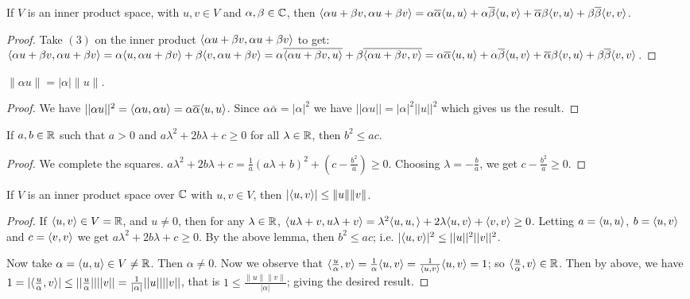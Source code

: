 \begin{lemma}
    If $V$ is an inner product space, with  $u,v \in V$ and  $\alpha,\beta \in \mathbb{C}$, then
    $\langle \alpha u+\beta v, \alpha u+\beta
    v\rangle=\alpha\overline{\alpha}\langle u,u\rangle+\alpha\overline{\beta}\langle u,v\rangle+\overline{\alpha}\beta\langle v,u\rangle+\beta\overline{\beta}\langle v,v\rangle$.
\end{lemma}
\begin{proof}
    Take $(3)$ on the inner product $\langle \alpha u+\beta v, \alpha u+\beta v\rangle$ to get: 
    $\langle \alpha u+\beta v, \alpha u+\beta v\rangle=\alpha\langle u,\alpha u+\beta v\rangle+\beta\langle v,
    \alpha u+\beta v\rangle=\alpha\overline{\langle \alpha u+\beta v,u\rangle}+\beta\overline{\langle \alpha u+\beta
v,v\rangle}=\alpha\overline{\alpha}\langle u,u\rangle+\alpha\overline{\beta}\langle u,v\rangle+\overline{\alpha}\beta\langle v,u\rangle+\beta\overline{\beta}\langle v,v\rangle$.
\end{proof}
\begin{corollary}
    $\|\alpha u\|=|\alpha|\|u\|.$
\end{corollary}
\begin{proof}
    We have $||\alpha u||^2=\langle \alpha u, \alpha u\rangle=\alpha\overline{\alpha}\langle u,u\rangle$. Since
    $\alpha\bar{\alpha}=|\alpha|^2$ we have $||\alpha u||=|\alpha|^2||u||^2$ which gives us the
    result.
\end{proof}

\begin{lemma}
    If $a,b \in \mathbb{R}$ such that $a>0$ and  $a\lambda^2+2b\lambda+c \geq 0$ for all  $\lambda \in \mathbb{R}$,
    then  $b^2 \leq ac$.
\end{lemma}
\begin{proof}
    We complete the squares. $a\lambda^2+2b\lambda+c=\frac{1}{a}(a\lambda+b)^2+(c-\frac{b^2}{a})
    \geq 0$. Choosing $\lambda=-\frac{b}{a}$, we get $c-\frac{b^2}{a} \geq 0$.
\end{proof}

\begin{theorem}
    If $V$ is an inner product space over  $\mathbb{C}$ with $u,v \in V$, then  $|\langle u,v\rangle| \leq
    \|u\|\|v\|$.
\end{theorem}
\begin{proof}
    If $\langle u,v\rangle \in V=\mathbb{R}$, and $u \neq 0$, then for any  $\lambda \in \mathbb{R}$,
    $\langle u\lambda+v,u\lambda+v\rangle=\lambda^2\langle u,u,\rangle+2\lambda\langle u,v\rangle+\langle v,v\rangle \geq
    0$. Letting $a=\langle u,u\rangle$, $b=\langle u,v\rangle$ and $c=\langle v,v\rangle$ we get
    $a\lambda^2+2b\lambda+c \geq 0$. By the above lemma, then  $b^2 \leq ac$; i.e.
    $|\langle u,v\rangle|^2 \leq ||u||^2||v||^2$.

    Now take $\alpha=\langle u,u\rangle \in V \neq \mathbb{R}$. Then $\alpha \neq 0$. Now we observe that
    $\langle \frac{u}{\alpha},v\rangle=\frac{1}{\alpha}\langle u,v\rangle=\frac{1}{\langle u,v\rangle}\langle u,v\rangle=1$;
    so $\langle \frac{u}{\alpha},v\rangle \in \mathbb{R}$. Then by above, we have $1=|\langle \frac{u}{\alpha},v\rangle|
    \leq ||\frac{u}{\alpha}||||v||=\frac{1}{|\alpha|}||u||||v||$, that is $1 \leq
    \frac{\|u\|\|v\|}{|\alpha|}$; giving the desired result.
\end{proof}

